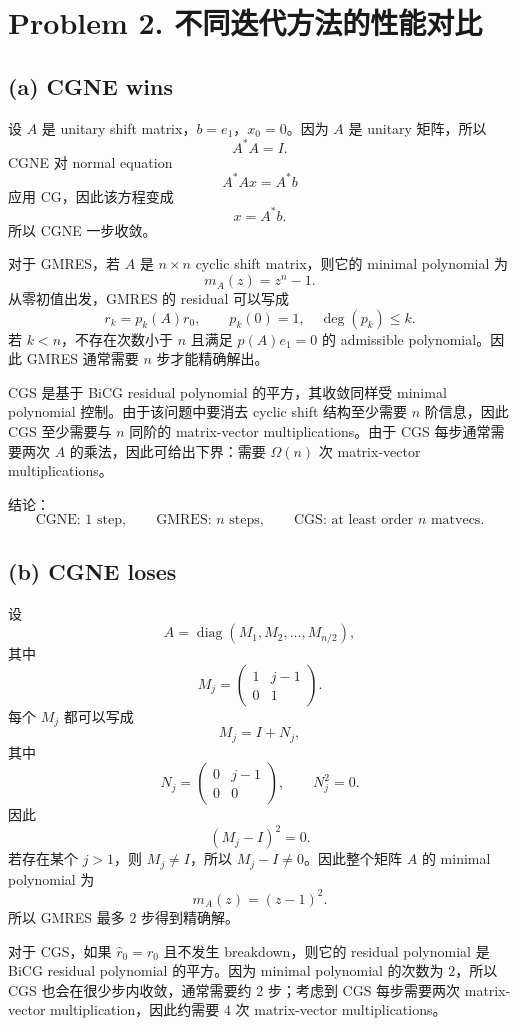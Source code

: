 \documentclass[11pt]{ctexart}
\begin{document}
\section*{Problem 2. 不同迭代方法的性能对比}

\subsection*{(a) CGNE wins}
设 $A$ 是 unitary shift matrix，$b=e_1$，$x_0=0$。因为 $A$ 是 unitary 矩阵，所以
\[
A^*A=I.
\]
CGNE 对 normal equation
\[
A^*Ax=A^*b
\]
应用 CG，因此该方程变成
\[
x=A^*b.
\]
所以 CGNE 一步收敛。

对于 GMRES，若 $A$ 是 $n\times n$ cyclic shift matrix，则它的 minimal polynomial 为
\[
m_A(z)=z^n-1.
\]
从零初值出发，GMRES 的 residual 可以写成
\[
r_k=p_k(A)r_0, \qquad p_k(0)=1,\quad \deg(p_k)\le k.
\]
若 $k<n$，不存在次数小于 $n$ 且满足 $p(A)e_1=0$ 的 admissible polynomial。因此 GMRES 通常需要 $n$ 步才能精确解出。

CGS 是基于 BiCG residual polynomial 的平方，其收敛同样受 minimal polynomial 控制。由于该问题中要消去 cyclic shift 结构至少需要 $n$ 阶信息，因此 CGS 至少需要与 $n$ 同阶的 matrix-vector multiplications。由于 CGS 每步通常需要两次 $A$ 的乘法，因此可给出下界：需要 $\Omega(n)$ 次 matrix-vector multiplications。

结论：
\[
\text{CGNE: 1 step}, \qquad \text{GMRES: } n \text{ steps}, \qquad \text{CGS: at least order } n \text{ matvecs}.
\]

\subsection*{(b) CGNE loses}
设
\[
A=\operatorname{diag}(M_1,M_2,\ldots,M_{n/2}),
\]
其中
\[
M_j=\begin{pmatrix}1&j-1\\0&1\end{pmatrix}.
\]
每个 $M_j$ 都可以写成
\[
M_j=I+N_j,
\]
其中
\[
N_j=\begin{pmatrix}0&j-1\\0&0\end{pmatrix}, \qquad N_j^2=0.
\]
因此
\[
(M_j-I)^2=0.
\]
若存在某个 $j>1$，则 $M_j\ne I$，所以 $M_j-I\ne 0$。因此整个矩阵 $A$ 的 minimal polynomial 为
\[
m_A(z)=(z-1)^2.
\]
所以 GMRES 最多 $2$ 步得到精确解。

对于 CGS，如果 $\hat r_0=r_0$ 且不发生 breakdown，则它的 residual polynomial 是 BiCG residual polynomial 的平方。因为 minimal polynomial 的次数为 $2$，所以 CGS 也会在很少步内收敛，通常需要约 $2$ 步；考虑到 CGS 每步需要两次 matrix-vector multiplication，因此约需要 $4$ 次 matrix-vector multiplications。
\end{document}
